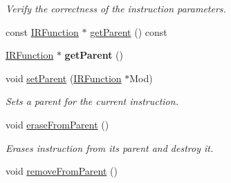 \begin{DoxyCompactItemize}
\begin{DoxyCompactList}\small\item\em Verify the correctness of the instruction parameters. \end{DoxyCompactList}\item 
const \hyperlink{classglow_1_1_i_r_function}{I\+R\+Function} $\ast$ \hyperlink{classglow_1_1_instruction_a8d10bad794e192db6315a4372fbe829c}{get\+Parent} () const
\item 
\mbox{\label{classglow_1_1_instruction_aa071b75e071e9207dac100c52f929ad6}} 
\hyperlink{classglow_1_1_i_r_function}{I\+R\+Function} $\ast$ {\bfseries get\+Parent} ()
\item 
\mbox{\label{classglow_1_1_instruction_acdad750586399d3a75a84206a3b649f3}} 
void \hyperlink{classglow_1_1_instruction_acdad750586399d3a75a84206a3b649f3}{set\+Parent} (\hyperlink{classglow_1_1_i_r_function}{I\+R\+Function} $\ast$Mod)
\begin{DoxyCompactList}\small\item\em Sets a parent for the current instruction. \end{DoxyCompactList}\item 
\mbox{\label{classglow_1_1_instruction_a6fe2f06b8a4b2c3d6308afb223a0238a}} 
void \hyperlink{classglow_1_1_instruction_a6fe2f06b8a4b2c3d6308afb223a0238a}{erase\+From\+Parent} ()
\begin{DoxyCompactList}\small\item\em Erases instruction from its parent and destroy it. \end{DoxyCompactList}\item 
void \hyperlink{classglow_1_1_instruction_a629b572e87d2515df70e10eac20ee5da}{remove\+From\+Parent} ()
\end{DoxyCompactItemize}
